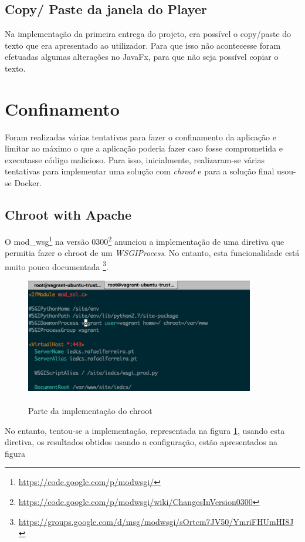 \documentclass[pdftex,12pt,a4paper]{report}
\begin{document}
\subsection{Copy/ Paste da janela do Player}
Na implementação da primeira entrega do projeto, era possível o copy/paste do texto que era apresentado ao utilizador. Para que isso não acontecesse foram efetuadas algumas alterações no JavaFx, para que não seja possível copiar o texto.


\section{Confinamento}
Foram realizadas várias tentativas para fazer o confinamento da aplicação e limitar ao máximo o que a aplicação poderia fazer caso fosse comprometida e executasse código malicioso. Para isso, inicialmente, realizaram-se várias tentativas para implementar uma solução com \textit{chroot} e para a solução final usou-se Docker.

\subsection{Chroot with Apache}
O mod\_wsg\footnote{\label{url1} \url{https://code.google.com/p/modwsgi/}} na versão 0300\footnote{\label{url1} \url{https://code.google.com/p/modwsgi/wiki/ChangesInVersion0300}} anunciou a implementação de uma diretiva que permitia fazer o chroot de um \textit{WSGIProcess}. No entanto, esta funcionalidade está muito pouco documentada \footnote{\label{url1} \url{https://groups.google.com/d/msg/modwsgi/sOrtcm7JV50/YmriFHUmHI8J}}.

\begin{figure}[!htb]
\center
 \includegraphics[width=100mm,scale=1]{apache_chroot_config.png}
 \caption{\\Parte da implementação do chroot}
 \label{fig:apache_chroot_config}
\end{figure}

No entanto, tentou-se a implementação, representada na figura \ref{fig:apache_chroot_config}, usando esta diretiva, os resultados obtidos usando a configuração, estão apresentados na figura ~ 
\end{document}
